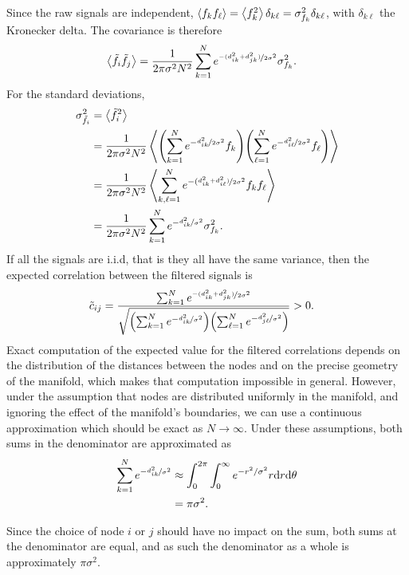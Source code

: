\documentclass{article}
\begin{document}
Since the raw signals are independent, $\expval{f_kf_\ell} = \expval{f_k^2}\delta_{k\ell} = \sigma_{f_k}^2\delta_{k\ell}$, with $\delta_{k\ell}$ the Kronecker delta. The covariance is therefore
\begin{align*}
    \expval{\Tilde{f}_i\Tilde{f}_j} &= \frac{1}{2\pi\sigma^2N^2}\sum_{k = 1}^N e^{\nicefrac{-(d_{ik}^2+d_{jk}^2)}{2\sigma^2}}\sigma_{f_k}^2.
\end{align*}
For the standard deviations,
\begin{align*}
    \sigma^2_{\Tilde{f}_i} &= \expval{\Tilde{f}_i^2}\\
    &= \frac{1}{2\pi\sigma^2N^2}\expval{\qty(\sum_{k=1}^N e^{-\nicefrac{d_{ik}^2}{2\sigma^2}}f_k)\qty(\sum_{\ell=1}^N e^{-\nicefrac{d_{i\ell}^2}{2\sigma^2}}f_\ell)}\\
    &= \frac{1}{2\pi\sigma^2N^2}\expval{\sum_{k, \ell =1}^N e^{-(\nicefrac{d_{ik}^2 + d_{i\ell}^2)}{2\sigma^2}}f_kf_\ell}\\
    &= \frac{1}{2\pi\sigma^2N^2}\sum_{k=1}^N e^{-\nicefrac{d_{ik}^2}{\sigma^2}}\sigma_{f_k}^2.
\end{align*}
If all the signals are i.i.d, that is they all have the same variance, then the expected correlation between the filtered signals is
\begin{align}
    \Tilde{c}_{ij} &= \frac{\sum_{k = 1}^N e^{\nicefrac{-(d_{ik}^2+d_{jk}^2)}{2\sigma^2}}}{\sqrt{\qty(\sum_{k=1}^N e^{-\nicefrac{d_{ik}^2}{\sigma^2}})\qty(\sum_{\ell=1}^N e^{-\nicefrac{d_{j\ell}^2}{\sigma^2}})}} > 0.
    \label{eq:artificial_correlation}
\end{align}
Exact computation of the expected value for the filtered correlations depends on the distribution of the distances between the nodes and on the precise geometry of the manifold, which makes that computation impossible in general. However, under the assumption that nodes are distributed uniformly in the manifold, and ignoring the effect of the manifold's boundaries, we can use a continuous approximation which should be exact as $N\to \infty$. Under these assumptions, both sums in the denominator are approximated as
\begin{align*}
    \sum_{k=1}^N e^{-\nicefrac{d_{ik}^2}{\sigma^2}} &\approx \int_0^{2\pi}\int_0^\infty e^{-r^2/\sigma^2}r\dd r\dd\theta\\
    &= \pi\sigma^2.
\end{align*}

Since the choice of node $i$ or $j$ should have no impact on the sum, both sums at the denominator are equal, and as such the denominator as a whole is approximately $\pi\sigma^2$. 
\end{document}
